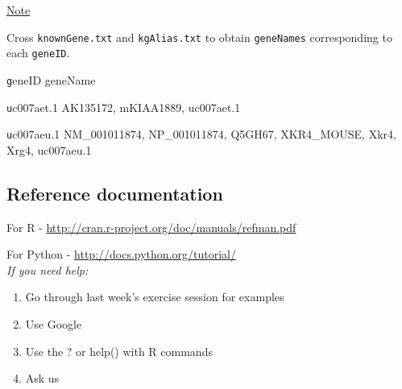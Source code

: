 \documentclass[a4paper,11pt]{article}
\begin{document}
\normalsize\underline{Note}

\indent\normalsize Cross \texttt{knownGene.txt} and \texttt{kgAlias.txt} to obtain \texttt{geneNames} corresponding to each \texttt{geneID}. 

\scriptsize\texttt  geneID geneName

\scriptsize\texttt  uc007aet.1	AK135172, mKIAA1889, uc007aet.1

\scriptsize\texttt  uc007aeu.1	NM\_001011874, NP\_001011874, Q5GH67, XKR4\_MOUSE, Xkr4, Xrg4, uc007aeu.1

\subsection{Reference documentation}
\normalsize For R - \url{http://cran.r-project.org/doc/manuals/refman.pdf}

For Python - \url{http://docs.python.org/tutorial/}\\

\emph{If you need help:}
\begin{enumerate}
\item Go through last week's exercise session for examples
\item Use Google
\item Use the ? or help() with R commands
\item Ask us
\end{enumerate}
\end{document}
